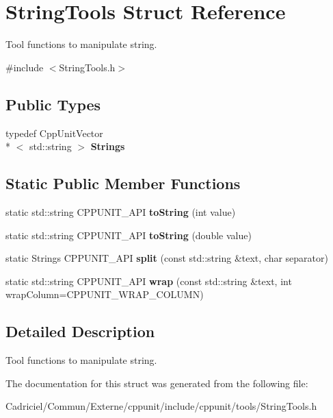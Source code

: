 \hypertarget{struct_string_tools}{\section{String\-Tools Struct Reference}
\label{struct_string_tools}
}


Tool functions to manipulate string.  




{\ttfamily \#include $<$String\-Tools.\-h$>$}

\subsection*{Public Types}
\begin{DoxyCompactItemize}
\item 
\hypertarget{struct_string_tools_ab01d065d80c39015955e9f765cd19921}{typedef Cpp\-Unit\-Vector\\*
$<$ std\-::string $>$ {\bfseries Strings}}\label{struct_string_tools_ab01d065d80c39015955e9f765cd19921}

\end{DoxyCompactItemize}
\subsection*{Static Public Member Functions}
\begin{DoxyCompactItemize}
\item 
\hypertarget{struct_string_tools_a2b4a4cbbfa69a2c28c71bd519ba71e5c}{static std\-::string C\-P\-P\-U\-N\-I\-T\-\_\-\-A\-P\-I {\bfseries to\-String} (int value)}\label{struct_string_tools_a2b4a4cbbfa69a2c28c71bd519ba71e5c}

\item 
\hypertarget{struct_string_tools_adfab22bf90b73231f635aa1ae299d4c4}{static std\-::string C\-P\-P\-U\-N\-I\-T\-\_\-\-A\-P\-I {\bfseries to\-String} (double value)}\label{struct_string_tools_adfab22bf90b73231f635aa1ae299d4c4}

\item 
\hypertarget{struct_string_tools_ac3c3d30a35c82c1d5fcb54e915130767}{static Strings C\-P\-P\-U\-N\-I\-T\-\_\-\-A\-P\-I {\bfseries split} (const std\-::string \&text, char separator)}\label{struct_string_tools_ac3c3d30a35c82c1d5fcb54e915130767}

\item 
\hypertarget{struct_string_tools_a02d43819e61394264c3e75c24433a057}{static std\-::string C\-P\-P\-U\-N\-I\-T\-\_\-\-A\-P\-I {\bfseries wrap} (const std\-::string \&text, int wrap\-Column=C\-P\-P\-U\-N\-I\-T\-\_\-\-W\-R\-A\-P\-\_\-\-C\-O\-L\-U\-M\-N)}\label{struct_string_tools_a02d43819e61394264c3e75c24433a057}

\end{DoxyCompactItemize}


\subsection{Detailed Description}
Tool functions to manipulate string. 

The documentation for this struct was generated from the following file\-:\begin{DoxyCompactItemize}
\item 
Cadriciel/\-Commun/\-Externe/cppunit/include/cppunit/tools/String\-Tools.\-h\end{DoxyCompactItemize}

